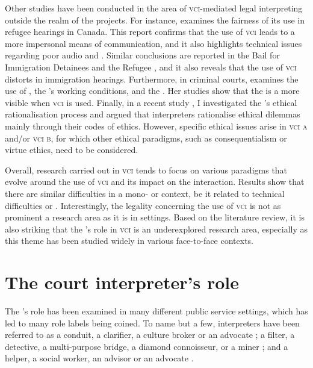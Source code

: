 \documentclass[output=paper]{langsci/langscibook}
\begin{document}
Other studies have been conducted in the area of \textsc{vci}-mediated legal interpreting outside the realm of the  projects. For instance, \citet{Ellis2004} examines the fairness of its use in refugee hearings in Canada. This report confirms that the use of \textsc{vci} leads to a more impersonal means of communication, and it also highlights technical issues regarding poor audio and . Similar conclusions are reported in the Bail for Immigration Detainees and the  Refugee , and it also reveals that the use of \textsc{vci}  distorts  in immigration hearings. Furthermore, in  criminal courts, \citet{Fowler2012} examines the use of , the ’s working conditions, and the . Her studies show that the  is a more visible  when \textsc{vci}  is used. Finally, in a recent study \citet{Devaux2017a}, I investigated the ’s ethical rationalisation process and argued that interpreters rationalise ethical dilemmas mainly through their codes of ethics. However, specific ethical issues arise in \textsc{vci a} and/or \textsc{vci b}, for which other ethical paradigms, such as consequentialism or virtue ethics, need to be considered. 

Overall, research carried out in \textsc{vci} tends to focus on various paradigms that evolve around the use of \textsc{vci}  and its impact on the interaction. Results show that there are similar difficulties in a mono- or  context, be it related to technical difficulties or . Interestingly, the legality concerning the use of \textsc{vci} is not as prominent a research area as it is in  settings. Based on the literature review, it is also striking that the ’s role in \textsc{vci} is an underexplored research area, especially as this theme has been studied widely in various face-to-face contexts. 

\section{The court interpreter’s role}
\label{sec:devaux:3}
The ’s role has been examined in many different public service settings, which has led to many role labels being coined. To name but a few, interpreters have been referred to as a conduit, a clarifier, a culture broker or an advocate \citep{Niska2002}; a filter, a detective, a multi-purpose bridge, a diamond connoisseur, or a miner \citep{Angelelli2004}; and a helper, a social worker, an advisor or an advocate \citep{Grbic2011}.
\end{document}
